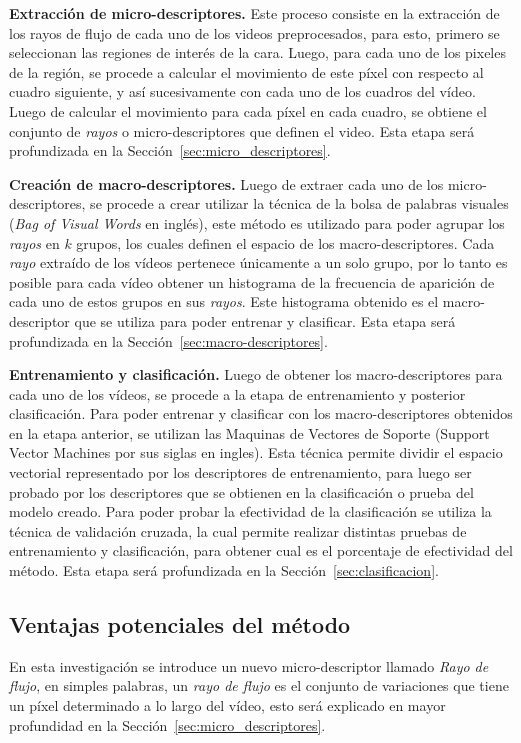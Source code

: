 \textbf{Extracción de micro-descriptores.}
Este proceso consiste en la extracción de los rayos de flujo de cada uno de los videos preprocesados, para esto, primero se seleccionan las regiones de interés de la cara. Luego, para cada uno de los pixeles de la región, se procede a calcular el movimiento de este píxel con respecto al cuadro siguiente, y así sucesivamente con cada uno de los cuadros del vídeo. Luego de calcular el movimiento para cada píxel en cada cuadro, se obtiene el conjunto de \textit{rayos} o micro-descriptores que definen el video. Esta etapa será profundizada en la Sección~\ref{sec:micro_descriptores}.


\textbf{Creación de macro-descriptores.}
Luego de extraer cada uno de los micro-descriptores, se procede a crear utilizar la técnica de la bolsa de palabras visuales (\textit{Bag of Visual Words} en inglés), este método es utilizado para poder agrupar los \textit{rayos} en $k$ grupos, los cuales definen el espacio de los macro-descriptores. Cada \textit{rayo} extraído de los vídeos pertenece únicamente a un solo grupo, por lo tanto es posible para cada vídeo obtener un histograma de la frecuencia de aparición de cada uno de estos grupos en sus \textit{rayos}. Este histograma obtenido es el macro-descriptor que se utiliza para poder entrenar y clasificar. Esta etapa será profundizada en la Sección~\ref{sec:macro-descriptores}.


\textbf{Entrenamiento y clasificación.}
Luego de obtener los macro-des\-crip\-tores para cada uno de los vídeos, se procede a la etapa de entrenamiento y posterior clasificación. Para poder entrenar y clasificar con los macro-descriptores obtenidos en la etapa anterior, se utilizan las Maquinas de Vectores de Soporte (Support Vector Machines por sus siglas en ingles). Esta técnica permite dividir el espacio vectorial representado por los descriptores de entrenamiento, para luego ser probado por los descriptores que se obtienen en la clasificación o prueba del modelo creado. Para poder probar la efectividad de la clasificación se utiliza la técnica de validación cruzada, la cual permite realizar distintas pruebas de entrenamiento y clasificación, para obtener cual es el porcentaje de efectividad del método. Esta etapa será profundizada en la Sección~\ref{sec:clasificacion}.

\subsection{Ventajas potenciales del método}
\label{intro:ventajas}
En esta investigación se introduce un nuevo micro-descriptor llamado \textit{Rayo de flujo}, en simples palabras, 
un \textit{rayo de flujo} es el conjunto de variaciones que tiene un píxel determinado a lo largo del vídeo, esto será explicado en mayor profundidad en la Sección~\ref{sec:micro_descriptores}.

